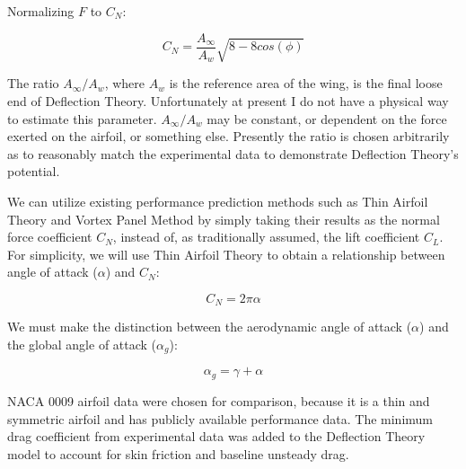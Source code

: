 Normalizing \(F\) to \(C_N\):

\begin{equation}
    C_N = \frac{A_\infty} {A_w} \sqrt{8 - 8 cos(\phi)}
\end{equation}

The ratio \(A_\infty / A_w\), where \(A_w\) is the reference area of the wing, is the final loose end of Deflection Theory. Unfortunately at present I do not have a physical way to estimate this parameter.
\(A_\infty / A_w\) may be constant, or dependent on the force exerted on the airfoil, or something else.
Presently the ratio is chosen arbitrarily as to reasonably match the experimental data to demonstrate Deflection Theory's potential.

We can utilize existing performance prediction methods such as Thin Airfoil Theory and Vortex Panel Method by simply taking their results as the normal force coefficient \(C_N\), instead of, as traditionally assumed, the lift coefficient \(C_L\). For simplicity, we will use Thin Airfoil Theory to obtain a relationship between angle of attack (\(\alpha\)) and \(C_N\):

\begin{equation}
    C_N = 2 \pi \alpha
\end{equation}

We must make the distinction between the aerodynamic angle of attack (\(\alpha\)) and the global angle of attack (\(\alpha_g\)):

\begin{equation}
    \alpha_g = \gamma + \alpha
\end{equation}

NACA 0009 airfoil data were chosen for comparison, because it is a thin and symmetric airfoil and has publicly available performance data. The minimum drag coefficient from experimental data was added to the Deflection Theory model to account for skin friction and baseline unsteady drag.

